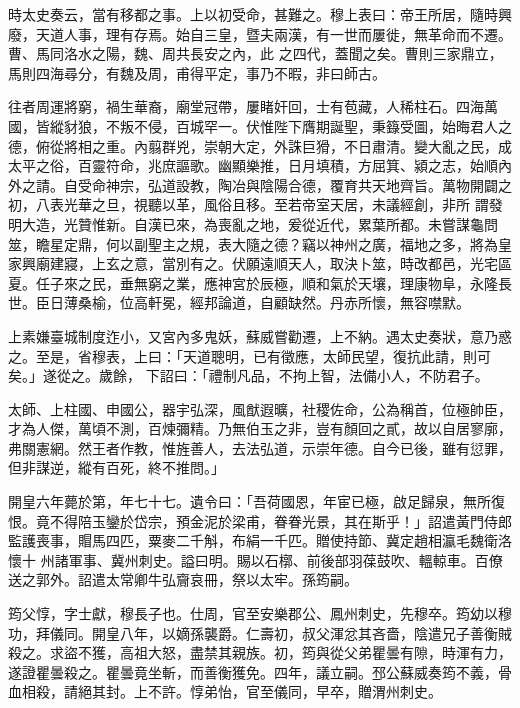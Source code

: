 \begin{pinyinscope}
 時太史奏云，當有移都之事。上以初受命，甚難之。穆上表曰：帝王所居，隨時興廢，天道人事，理有存焉。始自三皇，暨夫兩漢，有一世而屢徙，無革命而不遷。曹、馬同洛水之陽，魏、周共長安之內，此
 之四代，蓋聞之矣。曹則三家鼎立，馬則四海尋分，有魏及周，甫得平定，事乃不暇，非曰師古。



 往者周運將窮，禍生華裔，廟堂冠帶，屢睹奸回，士有苞藏，人稀柱石。四海萬國，皆縱豺狼，不叛不侵，百城罕一。伏惟陛下膺期誕聖，秉籙受圖，始晦君人之德，俯從將相之重。內翦群兇，崇朝大定，外誅巨猾，不日肅清。變大亂之民，成太平之俗，百靈符命，兆庶謳歌。幽顯樂推，日月填積，方屈箕、潁之志，始順內外之請。自受命神宗，弘道設教，陶冶與陰陽合德，覆育共天地齊旨。萬物開闢之初，八表光華之旦，視聽以革，風俗且移。至若帝室天居，未議經創，非所
 謂發明大造，光贊惟新。自漢已來，為喪亂之地，爰從近代，累葉所都。未嘗謀龜問筮，瞻星定鼎，何以副聖主之規，表大隨之德？竊以神州之廣，福地之多，將為皇家興廟建寢，上玄之意，當別有之。伏願遠順天人，取決卜筮，時改都邑，光宅區夏。任子來之民，垂無窮之業，應神宮於辰極，順和氣於天壤，理康物阜，永隆長世。臣日薄桑榆，位高軒冕，經邦論道，自顧缺然。丹赤所懷，無容噤默。



 上素嫌臺城制度迮小，又宮內多鬼妖，蘇威嘗勸遷，上不納。遇太史奏狀，意乃惑之。至是，省穆表，上曰：「天道聰明，已有徵應，太師民望，復抗此請，則可矣。」遂從之。歲餘，
 下詔曰：「禮制凡品，不拘上智，法備小人，不防君子。



 太師、上柱國、申國公，器宇弘深，風猷遐曠，社稷佐命，公為稱首，位極帥臣，才為人傑，萬頃不測，百煉彌精。乃無伯玉之非，豈有顏回之貳，故以自居寥廓，弗關憲網。然王者作教，惟旌善人，去法弘道，示崇年德。自今已後，雖有愆罪，但非謀逆，縱有百死，終不推問。」



 開皇六年薨於第，年七十七。遺令曰：「吾荷國恩，年宦已極，啟足歸泉，無所復恨。竟不得陪玉鑾於岱宗，預金泥於梁甫，眷眷光景，其在斯乎！」詔遣黃門侍郎監護喪事，賵馬四匹，粟麥二千斛，布絹一千匹。贈使持節、冀定趙相瀛毛魏衛洛懷十
 州諸軍事、冀州刺史。謚曰明。賜以石槨、前後部羽葆鼓吹、轀輬車。百僚送之郭外。詔遣太常卿牛弘齎哀冊，祭以太牢。孫筠嗣。



 筠父惇，字士獻，穆長子也。仕周，官至安樂郡公、鳳州刺史，先穆卒。筠幼以穆功，拜儀同。開皇八年，以嫡孫襲爵。仁壽初，叔父渾忿其吝嗇，陰遣兄子善衡賊殺之。求盜不獲，高祖大怒，盡禁其親族。初，筠與從父弟瞿曇有隙，時渾有力，遂證瞿曇殺之。瞿曇竟坐斬，而善衡獲免。四年，議立嗣。邳公蘇威奏筠不義，骨血相殺，請絕其封。上不許。惇弟怡，官至儀同，早卒，贈渭州刺史。




\end{pinyinscope}
